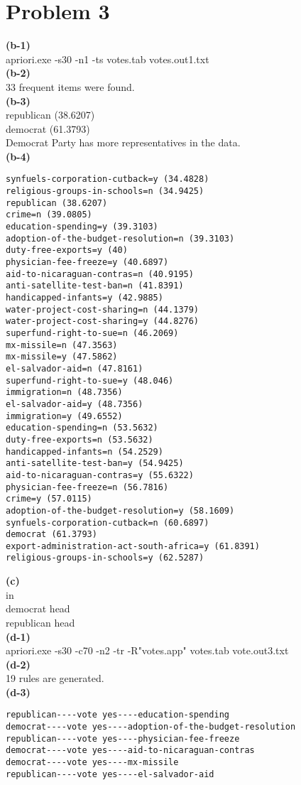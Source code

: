\documentclass[11pt]{scrartcl}
\begin{document}
\section*{Problem 3}
\textbf{(b-1)}\\
apriori.exe -s30 -n1 -ts votes.tab votes.out1.txt\\
\textbf{(b-2)}\\
33 frequent items were found.\\
\textbf{(b-3)}\\
republican (38.6207)\\
democrat (61.3793)\\
Democrat Party has more representatives in the data.\\
\textbf{(b-4)}\\
\begin{lstlisting}
synfuels-corporation-cutback=y (34.4828)
religious-groups-in-schools=n (34.9425)
republican (38.6207)
crime=n (39.0805)
education-spending=y (39.3103)
adoption-of-the-budget-resolution=n (39.3103)
duty-free-exports=y (40)
physician-fee-freeze=y (40.6897)
aid-to-nicaraguan-contras=n (40.9195)
anti-satellite-test-ban=n (41.8391)
handicapped-infants=y (42.9885)
water-project-cost-sharing=n (44.1379)
water-project-cost-sharing=y (44.8276)
superfund-right-to-sue=n (46.2069)
mx-missile=n (47.3563)
mx-missile=y (47.5862)
el-salvador-aid=n (47.8161)
superfund-right-to-sue=y (48.046)
immigration=n (48.7356)
el-salvador-aid=y (48.7356)
immigration=y (49.6552)
education-spending=n (53.5632)
duty-free-exports=n (53.5632)
handicapped-infants=n (54.2529)
anti-satellite-test-ban=y (54.9425)
aid-to-nicaraguan-contras=y (55.6322)
physician-fee-freeze=n (56.7816)
crime=y (57.0115)
adoption-of-the-budget-resolution=y (58.1609)
synfuels-corporation-cutback=n (60.6897)
democrat (61.3793)
export-administration-act-south-africa=y (61.8391)
religious-groups-in-schools=y (62.5287)
\end{lstlisting}
\textbf{(c)}\\
in\\
democrat head\\
republican head\\
\textbf{(d-1)}\\
apriori.exe -s30 -c70 -n2 -tr -R"votes.app" votes.tab vote.out3.txt\\
\textbf{(d-2)}\\
19 rules are generated.\\
\textbf{(d-3)}\\
\begin{lstlisting}
republican----vote yes----education-spending
democrat----vote yes----adoption-of-the-budget-resolution
republican----vote yes----physician-fee-freeze
democrat----vote yes----aid-to-nicaraguan-contras
democrat----vote yes----mx-missile
republican----vote yes----el-salvador-aid
\end{lstlisting}
\end{document}
